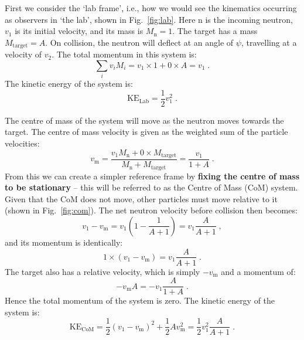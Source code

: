First we consider the `lab frame', i.e., how we would see the kinematics occurring as observers in `the lab', shown in Fig.~\ref{fig:lab}. Here n is the incoming neutron, $v_1$ is its initial velocity, and its mass is $M_\mathrm{n} = 1$. The target has a mass $M_\mathrm{target} = A$. On collision, the neutron will deflect at an angle of $\psi$, travelling at a velocity of $v_2$. The total momentum in this system is:
\begin{equation*}
    \sum_i v_i M_i = v_1 \times 1 + 0 \times A = v_1\;\mathrm{.}
\end{equation*}
The kinetic energy of the system is:
\begin{equation*}
    \mathrm{KE}_\mathrm{Lab} = \frac{1}{2}v^2_\mathrm{1}\;\mathrm{.}
\end{equation*}

The centre of mass of the system will move as the neutron moves towards the target. The centre of mass velocity is given as the weighted sum of the particle velocities:
\begin{equation*}
    v_\mathrm{m} = \frac{v_1M_\mathrm{n} + 0\times M_\mathrm{target}}{M_\mathrm{n}+M_\mathrm{target}} = \frac{v_1}{1+A}\;\mathrm{.}
\end{equation*}
From this we can create a simpler reference frame by \textbf{fixing the centre of mass to be stationary} -- this will be referred to as the Centre of Mass (CoM) system. Given that the CoM does not move, other particles must move relative to it (shown in Fig.~\ref{fig:com}). The net neutron velocity before collision then becomes:
\begin{equation*}
    v_1 - v_\mathrm{m} = v_1\left(1 - \frac{1}{A+1}\right) = v_1\frac{A}{A+1}\;\mathrm{,}
\end{equation*}
and its momentum is identically:
\begin{equation*}
    1 \times (v_1 - v_\mathrm{m}) = v_1\frac{A}{A+1}\;\mathrm{.}
\end{equation*}
The target also has a relative velocity, which is simply $-v_\mathrm{m}$ and a momentum of: \begin{equation*}
    -v_\mathrm{m}A = -v_1\frac{A}{1+A}\;\mathrm{.}
\end{equation*}
Hence the total momentum of the system is zero. The kinetic energy of the system is:
\begin{equation*}
    \mathrm{KE}_\mathrm{CoM} = \frac{1}{2}\left(v_1 - v_\mathrm{m}\right)^2 + \frac{1}{2}Av^2_\mathrm{m} = \frac{1}{2}v^2_1\frac{A}{A+1}\;\mathrm{.}
\end{equation*}

